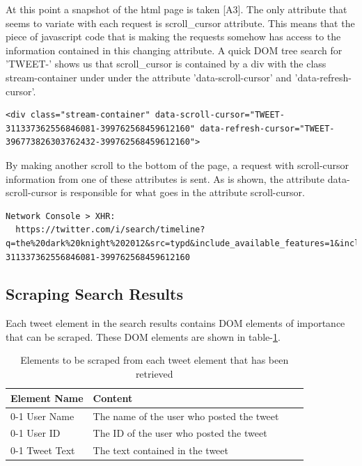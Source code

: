 At this point a snapshot of the html page is taken [A3]. The only attribute that seems to variate with each request is scroll\_cursor attribute. This means that the piece of javascript code that is making the requests somehow has access to the information contained in this changing attribute. A quick DOM tree search for 'TWEET-' shows us that scroll\_cursor is contained by a div with the class stream-container under under the attribute 'data-scroll-cursor' and 'data-refresh-cursor'.

  \begin{lstlisting}[caption={TODO: Caption},label={},captionpos=b]
  <div class="stream-container" data-scroll-cursor="TWEET-311337362556846081-399762568459612160" data-refresh-cursor="TWEET-396773826303762432-399762568459612160">
  \end{lstlisting}

By making another scroll to the bottom of the page, a request with scroll-cursor information from one of these attributes is sent.
As is shown, the attribute data-scroll-cursor is responsible for what goes in the attribute scroll-cursor.

  \begin{lstlisting}[caption={TODO: Caption},label={},captionpos=b]
  Network Console > XHR:
  https://twitter.com/i/search/timeline?q=the%20dark%20knight%202012&src=typd&include_available_features=1&include_entities=1&last_note_ts=0&scroll_cursor=TWEET-311337362556846081-399762568459612160
  \end{lstlisting}

\subsection{Scraping Search Results}

Each tweet element in the search results contains DOM elements of importance that can be scraped. These DOM elements are shown in table-\ref{table:important-tweet-element-elements}.

\begin{table}[H]
\centering
\begin{tabularx}{5.3\textwidth}{ lp{7cm} lp{5cm} }
  \textbf{Element Name} & \textbf{Content}\\
  \cline{0-1}
  User Name & The name of the user who posted the tweet \\
  \cline{0-1}
  User ID & The ID of the user who posted the tweet \\
  \cline{0-1}
  Tweet Text & The text contained in the tweet
\end{tabularx}
\caption{Elements to be scraped from each tweet element that has been retrieved}
\label{table:important-tweet-element-elements}
\end{table}

